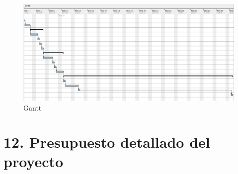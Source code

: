 \documentclass[
11pt, %
]{charter}
\begin{document}
\begin{landscape}
\begin{figure}[H]
\centering 
\includegraphics[width=1.5\textwidth]{./Figuras/gantt_2_2.png}
\caption{Gantt}
\label{fig:AoN}
\end{figure}
\end{landscape}


\section{12. Presupuesto detallado del proyecto}
\label{sec:presupuesto}
\end{document}
